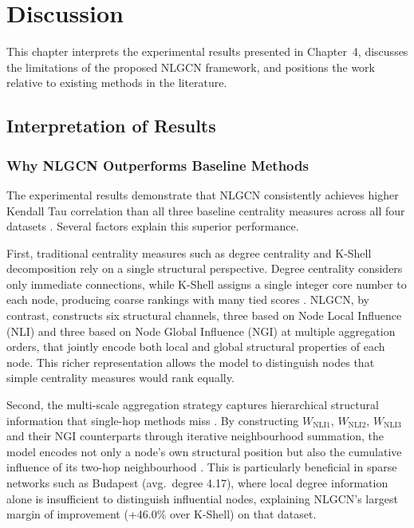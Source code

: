 \chapter{Discussion}

This chapter interprets the experimental results presented in
Chapter~4, discusses the limitations of the proposed NLGCN framework,
and positions the work relative to existing methods in the literature.

\section{Interpretation of Results}

\subsection{Why NLGCN Outperforms Baseline Methods}

The experimental results demonstrate that NLGCN consistently achieves
higher Kendall Tau correlation than all three baseline centrality
measures across all four datasets . Several factors
explain this superior performance.

First, traditional centrality measures such as degree centrality and K-Shell decomposition 
rely on a single structural perspective. Degree centrality considers
only immediate connections, while K-Shell assigns a single integer
core number to each node, producing coarse rankings with many tied
scores \cite{chen2012, mukhtar}. NLGCN, by contrast, constructs six
structural channels, three based on Node Local Influence (NLI) and
three based on Node Global Influence (NGI) at multiple aggregation
orders, that jointly encode both local and global structural
properties of each node. This richer
representation allows the model to distinguish nodes that simple
centrality measures would rank equally.

Second, the multi-scale aggregation strategy captures hierarchical
structural information that single-hop methods miss \cite{zhang2019gcn}. By constructing $W_{\text{NLI}1}$, $W_{\text{NLI}2}$,
$W_{\text{NLI}3}$ and their NGI counterparts through iterative
neighbourhood summation, the model encodes not only a node's own
structural position but also the cumulative influence of its
two-hop neighbourhood \cite{guo2026}. This is particularly beneficial
in sparse networks such as Budapest (avg.\ degree 4.17), where local
degree information alone is insufficient to distinguish influential
nodes, explaining NLGCN's largest margin of improvement
(+46.0\% over K-Shell) on that dataset.

